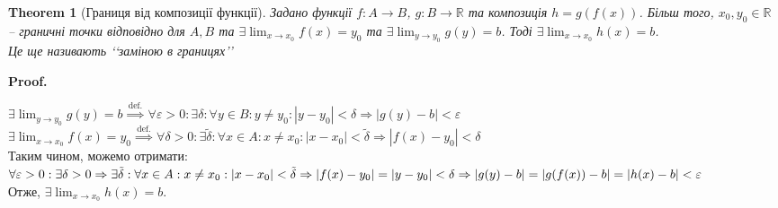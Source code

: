 \documentclass[a4paper, 14pt]{article}
\makeatletter
\def\qed{$\blacksquare$}
\theoremstyle{theoremdd}
\newtheorem{theorem}{Theorem}[subsection]
\theoremstyle{theoremdd}
\theoremstyle{theoremdd}
\theoremstyle{theoremdd}
\theoremstyle{theoremdd}
\theoremstyle{theoremdd}
\theoremstyle{theoremdd}
\theoremstyle{theoremdd}
\renewenvironment{proof}[1][Proof.\\]{\par
\pushQED{\hfill \qed}%
\normalfont \topsep6\p@\@plus6\p@\relax
\trivlist
\item\relax
{\bfseries
#1\@addpunct{.}}\hspace\labelsep\ignorespaces
}{%
\popQED\endtrivlist\@endpefalse
}
\makeatother
\begin{document}
\begin{theorem}[Границя від композиції функції]
Задано функції $f \colon A \to B$, $g \colon B \to \mathbb{R}$ та композиція $h = g(f(x))$. Більш того, $x_0, y_0 \in \mathbb{R}$ -- граничні точки відповідно для $A,B$ та $\exists \displaystyle \lim_{x \to x_0} f(x) = y_0$ та $\exists \displaystyle \lim_{y \to y_0} g(y) = b$. Тоді $\exists \displaystyle \lim_{x \to x_0} h(x) = b$.\\
\textit{Це ще називають \lq\lq заміною в границях\rq\rq}
\end{theorem}

\begin{proof}
$\exists \displaystyle \lim_{y \to y_0} g(y) = b \overset{\textrm{def.}}{\implies} \forall \varepsilon > 0: \exists \delta: \forall y \in B: y \neq y_0: |y-y_0|<\delta \Rightarrow |g(y)-b|<\varepsilon$\\
$\exists \displaystyle \lim_{x \to x_0} f(x) = y_0 \overset{\textrm{def.}}{\implies} \forall \delta > 0: \exists \tilde{\delta}: \forall x \in A: x \neq x_0: |x-x_0|<\tilde{\delta} \Rightarrow |f(x)-y_0|<\delta$\\
Таким чином, можемо отримати: $\forall \varepsilon > 0: \exists \delta > 0 \Rightarrow \exists \tilde{\delta}: \forall x \in A: x \neq x_0: |x-x_0| < \tilde{\delta} \Rightarrow \\ |f(x)-y_0| = |y-y_0|<\delta \Rightarrow |g(y)-b|=|g(f(x))-b| = |h(x)-b|<\varepsilon$\\
Отже, $\exists \displaystyle \lim_{x \to x_0} h(x) = b$.
\end{proof}
\end{document}
